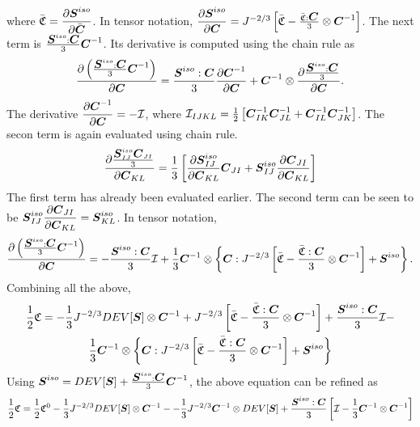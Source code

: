 \documentclass[11pt,twoside,TimesRoman]{article}
\newcommand{\parder}[2]{{\dfrac{\partial #1}{\partial #2}}}
\begin{document}
where $\bar{\mathfrak{C}} = \parder{\bfS^{iso}}{\bfCbar}$. In tensor notation, $\parder{\bfS^{iso}}{\bfC} = J^{-2/3}\left[\bar{\mathfrak{C}}- \frac{\bar{\mathfrak{C}}: \bfC}{3}  \otimes \bfC^{-1} \right]$. The next term is $\frac{\mbox{\boldmath $S$}^{iso}:\mbox{\boldmath $C$}}{3}\mbox{\boldmath $C$}^{-1}$. Its derivative is computed using the chain rule as
\begin{equation}
	\parder{\left( \frac{\bfS^{iso}:\bfC}{3}\bfC^{-1} \right)}{\bfC} = \frac{\bfS^{iso}:\bfC}{3} \parder{\bfCinv}{\bfC} + \bfCinv \otimes \parder{\frac{\bfS^{iso}:\bfC}{3}}{\bfC}.
\end{equation} 
The derivative $\parder{\bfCinv}{\bfC} = -\mathcal{I}$, where $\mathcal{I}_{IJKL} = \frac{1}{2} \left[ {\mbox{\boldmath $C$}}^{-1}_{IK} {\mbox{\boldmath $C$}}^{-1}_{JL} + {\mbox{\boldmath $C$}}^{-1}_{IL} {\mbox{\boldmath $C$}}^{-1}_{JK} \right] $. The secon term is again evaluated using chain rule.
\begin{gather}
 	\parder{\frac{\bfS^{iso}_{IJ}\bfC_{JI}}{3}}{\bfC_{KL}} = \frac{1}{3} \left[  \parder{\bfS^{iso}_{IJ}}{\bfC_{KL}} \bfC_{JI} +  \bfS^{iso}_{IJ}  \parder{\bfC_{JI}}{\bfC_{KL}}   \right] 
\end{gather}
The first term has already been evaluated earlier. The second term can be seen to be $\bfS^{iso}_{IJ}  \parder{\bfC_{JI}}{\bfC_{KL}} = \bfS^{iso}_{KL}$. In tensor notation,
\begin{equation}
\parder{\left( \frac{\bfS^{iso}:\bfC}{3}\bfC^{-1} \right)}{\bfC} = -\frac{\bfS^{iso}:\bfC}{3} \mathcal{I}  + \frac{1}{3} \bfCinv \otimes \left\lbrace   \bfC:J^{-2/3} \left[\bar{\mathfrak{C}} - \frac{\bar{\mathfrak{C}}:\bfC}{3}\otimes\bfCinv  \right]  + \bfS^{iso}       \right\rbrace.
\end{equation}
Combining all the above,
\begin{multline}
\frac{1}{2}\mathfrak{C} = -\frac{1}{3} J^{-2/3} DEV[\mbox{\boldmath $S$}]  \otimes {\mbox{\boldmath $C$}^{-1}} + J^{-2/3}\left[\bar{\mathfrak{C}}- \frac{\bar{\mathfrak{C}}: \mbox{\boldmath $C$}}{3}  \otimes \mbox{\boldmath $C$}^{-1} \right] +\frac{\mbox{\boldmath $S$}^{iso}:\mbox{\boldmath $C$}}{3} \mathcal{I}  - \\
\frac{1}{3} {\mbox{\boldmath $C$}}^{-1} \otimes \left\lbrace   \mbox{\boldmath $C$}:J^{-2/3} \left[\bar{\mathfrak{C}} - \frac{\bar{\mathfrak{C}}:\mbox{\boldmath $C$}}{3}\otimes{\mbox{\boldmath $C$}}^{-1}  \right]  + \mbox{\boldmath $S$}^{iso}       \right\rbrace
\end{multline}
Using $\mbox{\boldmath $S$}^{iso} = DEV[\mbox{\boldmath $S$}] + \frac{\mbox{\boldmath $S$}^{iso}:\mbox{\boldmath $C$}}{3} {\mbox{\boldmath $C$}}^{-1}$, the above equation can be refined as 
\begin{multline}
\frac{1}{2}\mathfrak{C} = \frac{1}{2}\mathfrak{C}^0-\frac{1}{3} J^{-2/3} DEV[\mbox{\boldmath $S$}]  \otimes {\mbox{\boldmath $C$}}^{-1} - -\frac{1}{3}J^{-2/3} {\mbox{\boldmath $C$}}^{-1} \otimes  DEV[\mbox{\boldmath $S$}]  + 
\frac{\mbox{\boldmath $S$}^{iso}:\mbox{\boldmath $C$}}{3}\left[ \mathcal{I} - \frac{1}{3} {\mbox{\boldmath $C$}}^{-1} \otimes {\mbox{\boldmath $C$}}^{-1} \right]
\end{multline}
\end{document}
